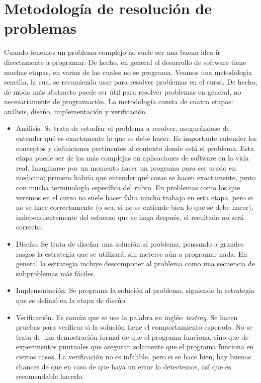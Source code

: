 \documentclass[a4paper, 12pt]{report}
\theoremstyle{definition}
\begin{document}
\section{Metodología de resolución de problemas}

Cuando tenemos un problema complejo no suele ser una buena idea ir directamente a programar. De hecho, en general el desarrollo de software tiene muchas etapas, en varias de las cuales no se programa. Veamos una metodología sencilla, la cual se recomienda usar para resolver problemas en el curso. De hecho, de modo más abstracto puede ser útil para resolver problemas en general, no necesariamente de programación. La metodología consta de cuatro etapas: análisis, diseño, implementación y verificación.
\begin{itemize}
	\item Análisis. Se trata de estudiar el problema a resolver, asegurándose de entender qué es exactamente lo que se debe hacer. Es importante entender los conceptos y definiciones pertinentes al contexto donde está el problema. Esta etapa puede ser de las más complejas en aplicaciones de software en la vida real. Imaginarse por un momento hacer un programa para ser usado en medicina; primero habría que entender qué cosas se hacen exactamente, junto con mucha terminología específica del rubro. En problemas como los que veremos en el curso no suele hacer falta mucho trabajo en esta etapa, pero si no se hace correctamente (o sea, si no se entiende bien lo que se debe hacer), independientemente del esfuerzo que se haga después, el resultado no será correcto.
	
	\item Diseño. Se trata de diseñar una solución al problema, pensando a grandes rasgos la estrategia que se utilizará, sin meterse aún a programar nada. En general la estrategia incluye descomponer al problema como una secuencia de subproblemas más fáciles.
	
	\item Implementación. Se programa la solución al problema, siguiendo la estrategia que se definió en la etapa de diseño.
	
	\item Verificación. Es común que se use la palabra en inglés: {\sl testing}. Se hacen pruebas para verificar si la solución tiene el comportamiento esperado. No se trata de una demostración formal de que el programa funciona, sino que de experimentos puntuales que aseguran solamente que el programa funciona en ciertos casos. La verificación no es infalible, pero si se hace bien, hay buenas chances de que en caso de que haya un error lo detectemos, así que es recomendable hacerlo.
\end{itemize}
\end{document}
